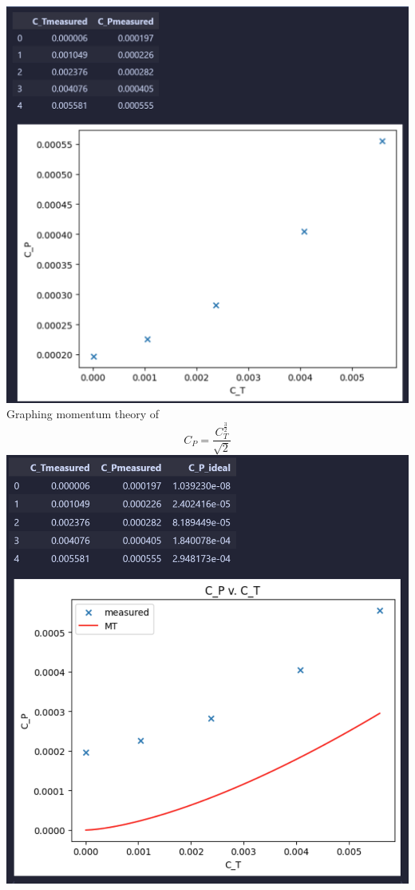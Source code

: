 \documentclass[12pt]{exam}
\begin{document}
\begin{questions}
\begin{solutionorbox}[\stretch{1}]
\includegraphics[width = \linewidth]{cp v ct measured.png}
Graphing momentum theory of \[C_P = \frac{C_T^{\frac{3}{2}}}{\sqrt{2}}\]
\includegraphics[width=\linewidth]{cp v ct mt.png}


\end{solutionorbox}
\end{questions}
\end{document}
